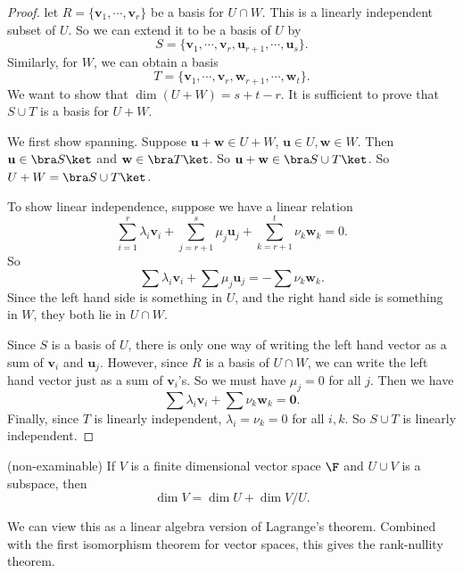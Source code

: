 \documentclass[a4paper]{article}
\begin{document}
\begin{proof}
  let $R = \{\mathbf{v}_1, \cdots, \mathbf{v}_r\}$ be a basis for $U\cap W$. This is a linearly independent subset of $U$. So we can extend it to be a basis of $U$ by
  \[
    S = \{\mathbf{v}_1, \cdots, \mathbf{v}_r, \mathbf{u}_{r + 1}, \cdots, \mathbf{u}_s\}.
  \]
  Similarly, for $W$, we can obtain a basis
  \[
    T = \{\mathbf{v}_1, \cdots, \mathbf{v}_r, \mathbf{w}_{r + 1}, \cdots, \mathbf{w}_t\}.
  \]
  We want to show that $\dim (U + W) = s + t - r$. It is sufficient to prove that $S\cup T$ is a basis for $U + W$.

  We first show spanning. Suppose $\mathbf{u} + \mathbf{w} \in U + W$, $\mathbf{u}\in U, \mathbf{w}\in W$.  Then $\mathbf{u}\in \bra S\ket$ and $\mathbf{w}\in \bra T\ket$. So $\mathbf{u} + \mathbf{w} \in \bra S\cup T\ket$. So $U + W = \bra S \cup T\ket$.

  To show linear independence, suppose we have a linear relation
  \[
    \sum_{i = 1}^r \lambda_i \mathbf{v}_i + \sum_{j = r + 1}^s \mu_j \mathbf{u}_j + \sum_{k = r + 1}^t \nu_k \mathbf{w}_k = 0.
  \]
  So
  \[
    \sum \lambda_i \mathbf{v}_i + \sum \mu_j \mathbf{u}_j = - \sum \nu_k \mathbf{w}_k.
  \]
  Since the left hand side is something in $U$, and the right hand side is something in $W$, they both lie in $U\cap W$.

  Since $S$ is a basis of $U$, there is only one way of writing the left hand vector as a sum of $\mathbf{v}_i$ and $\mathbf{u}_j$. However, since $R$ is a basis of $U\cap W$, we can write the left hand vector just as a sum of $\mathbf{v}_i$'s. So we must have $\mu_j = 0$ for all $j$. Then we have
  \[
    \sum \lambda_i \mathbf{v}_i + \sum \nu_k \mathbf{w}_k = \mathbf{0}.
  \]
  Finally, since $T$ is linearly independent, $\lambda_i = \nu_k = 0$ for all $i, k$. So $S\cup T$ is linearly independent.
\end{proof}

\begin{prop}(non-examinable)
  If $V$ is a finite dimensional vector space $\F$ and $U\cup V$ is a subspace, then
  \[
    \dim V = \dim U + \dim V/U.
  \]
\end{prop}
We can view this as a linear algebra version of Lagrange's theorem. Combined with the first isomorphism theorem for vector spaces, this gives the rank-nullity theorem.
\end{document}

